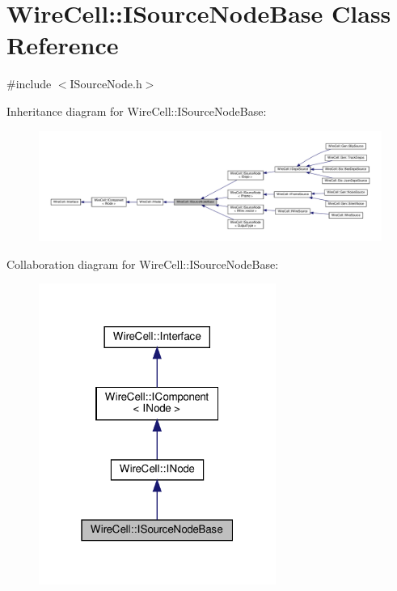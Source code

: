 \hypertarget{class_wire_cell_1_1_i_source_node_base}{}\section{Wire\+Cell\+:\+:I\+Source\+Node\+Base Class Reference}
\label{class_wire_cell_1_1_i_source_node_base}


{\ttfamily \#include $<$I\+Source\+Node.\+h$>$}



Inheritance diagram for Wire\+Cell\+:\+:I\+Source\+Node\+Base\+:
\nopagebreak
\begin{figure}[H]
\begin{center}
\leavevmode
\includegraphics[width=350pt]{class_wire_cell_1_1_i_source_node_base__inherit__graph}
\end{center}
\end{figure}


Collaboration diagram for Wire\+Cell\+:\+:I\+Source\+Node\+Base\+:
\nopagebreak
\begin{figure}[H]
\begin{center}
\leavevmode
\includegraphics[width=220pt]{class_wire_cell_1_1_i_source_node_base__coll__graph}
\end{center}
\end{figure}
